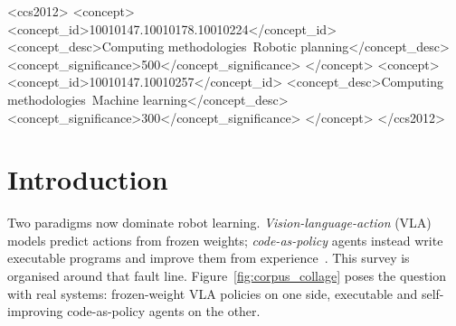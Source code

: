 \PassOptionsToPackage{svgnames,dvipsnames}{xcolor} \documentclass[acmsmall,screen,nonacm]{acmart}
\begin{document}
\begin{CCSXML}
<ccs2012>
   <concept>
       <concept_id>10010147.10010178.10010224</concept_id>
       <concept_desc>Computing methodologies~Robotic planning</concept_desc>
       <concept_significance>500</concept_significance>
   </concept>
   <concept>
       <concept_id>10010147.10010257</concept_id>
       <concept_desc>Computing methodologies~Machine learning</concept_desc>
       <concept_significance>300</concept_significance>
   </concept>
</ccs2012>
\end{CCSXML}


\maketitle

\section{Introduction}
\label{sec:intro}

Two paradigms now dominate robot learning. \emph{Vision-language-action} (VLA)
models predict actions from frozen weights; \emph{code-as-policy} agents instead
write executable programs and improve them from experience~\citep{codeaspolicies,aspire}.
This survey is organised around that fault line. Figure~\ref{fig:corpus_collage} poses the question
with real systems: frozen-weight VLA policies on one side, executable and self-improving
code-as-policy agents on the other.
\end{document}
